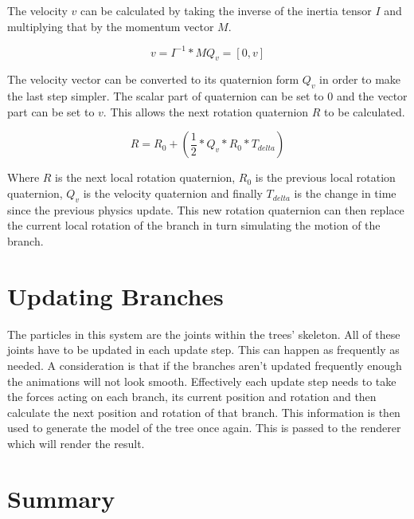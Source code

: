 \noindent
The velocity $v$ can be calculated by taking the inverse of the inertia tensor $I$ and multiplying that by the momentum vector $M$.

\begin{equation}
v = I^{-1} * M
Q_v = [0, v]
\end{equation}

\noindent
The velocity vector can be converted to its quaternion form $Q_v$ in order to make the last step simpler. The scalar part of quaternion can be set to 0 and the vector part can be set to $v$. This allows the next rotation quaternion $R$ to be calculated. 

\begin{equation}
R = R_0 + (\frac{1}{2} * Q_v * R_0 * T_{delta})
\end{equation}

\noindent
Where $R$ is the next local rotation quaternion, $R_0$ is the previous local rotation quaternion, $Q_v$ is the velocity quaternion and finally $T_{delta}$ is the change in time since the previous physics update. This new rotation quaternion can then replace the current local rotation of the branch in turn simulating the motion of the branch.

\section{Updating Branches}

The particles in this system are the joints within the trees' skeleton. All of these joints have to be updated in each update step. This can happen as frequently as needed. A consideration is that if the branches aren't updated frequently enough the animations will not look smooth. Effectively each update step needs to take the forces acting on each branch, its current position and rotation and then calculate the next position and rotation of that branch. This information is then used to generate the model of the tree once again. This is passed to the renderer which will render the result. 

\section{Summary}


